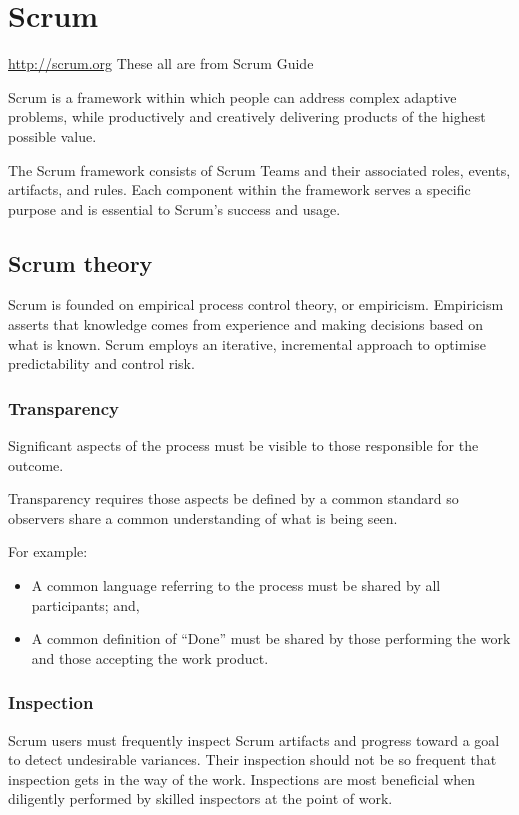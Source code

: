 \section{Scrum}

\url{http://scrum.org} These all are from Scrum Guide

Scrum is a framework within which people can address complex adaptive problems, while productively and creatively delivering products of the highest possible value.

The Scrum framework consists of Scrum Teams and their associated roles, events, artifacts, and rules. Each component within the framework serves a specific purpose and is essential to Scrum’s success and usage.

\subsection{Scrum theory}

Scrum is founded on empirical process control theory, or empiricism. Empiricism asserts that knowledge comes from experience and making decisions based on what is known. Scrum
employs an iterative, incremental approach to optimise predictability and control risk.

\subsubsection{Transparency}

Significant aspects of the process must be visible to those responsible for the outcome. 

Transparency requires those aspects be defined by a common standard so observers share a common understanding of what is being seen.

For example:
\begin{itemize}
    \item A common language referring to the process must be shared by all participants; and,
    \item A common definition of “Done” must be shared by those performing the work and those accepting the work product.
\end{itemize}

\subsubsection{Inspection}

Scrum users must frequently inspect Scrum artifacts and progress toward a goal to detect undesirable variances. Their inspection should not be so frequent that inspection gets in the way of the work. Inspections are most beneficial when diligently performed by skilled inspectors at 
the point of work.


